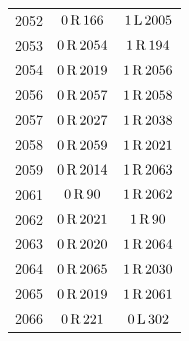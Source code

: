 \begin{longtable}{@{}rcc@{}}
2052 & $0\,\mathrm{R}\,166$ & $1\,\mathrm{L}\,2005$\\
2053 & $0\,\mathrm{R}\,2054$ & $1\,\mathrm{R}\,194$\\
2054 & $0\,\mathrm{R}\,2019$ & $1\,\mathrm{R}\,2056$\\
2056 & $0\,\mathrm{R}\,2057$ & $1\,\mathrm{R}\,2058$\\
2057 & $0\,\mathrm{R}\,2027$ & $1\,\mathrm{R}\,2038$\\
2058 & $0\,\mathrm{R}\,2059$ & $1\,\mathrm{R}\,2021$\\
2059 & $0\,\mathrm{R}\,2014$ & $1\,\mathrm{R}\,2063$\\
2061 & $0\,\mathrm{R}\,90$ & $1\,\mathrm{R}\,2062$\\
2062 & $0\,\mathrm{R}\,2021$ & $1\,\mathrm{R}\,90$\\
2063 & $0\,\mathrm{R}\,2020$ & $1\,\mathrm{R}\,2064$\\
2064 & $0\,\mathrm{R}\,2065$ & $1\,\mathrm{R}\,2030$\\
2065 & $0\,\mathrm{R}\,2019$ & $1\,\mathrm{R}\,2061$\\
2066 & $0\,\mathrm{R}\,221$ & $0\,\mathrm{L}\,302$\\
\end{longtable}\normalsize
